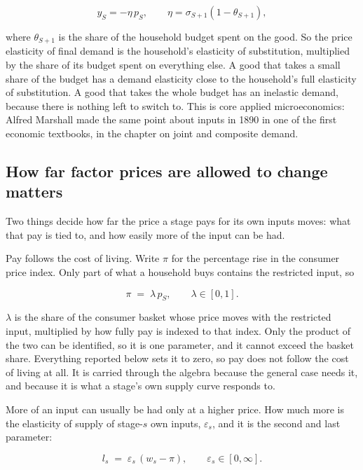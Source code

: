 \documentclass[11pt,a4paper]{article}
\begin{document}
\begin{equation}
y_S = -\eta \, p_S, \qquad \eta = \sigma_{S+1}(1-\theta_{S+1}) ,
\end{equation}

where $\theta_{S+1}$ is the share of the household budget spent on the good. So the price elasticity of final demand is the household's elasticity of substitution, multiplied by the share of its budget spent on everything else. A good that takes a small share of the budget has a demand elasticity close to the household's full elasticity of substitution. A good that takes the whole budget has an inelastic demand, because there is nothing left to switch to. This is core applied microeconomics: Alfred Marshall made the same point about inputs in 1890 in one of the first economic textbooks, in the chapter on joint and composite demand.

\subsection{How far factor prices are allowed to change matters}
\label{sec:factor}

Two things decide how far the price a stage pays for its own inputs moves: what that pay is tied to, and how easily more of the input can be had.

Pay follows the cost of living. Write $\pi$ for the percentage rise in the consumer price index. Only part of what a household buys contains the restricted input, so

\begin{equation}
\pi \;=\; \lambda \, p_S , \qquad \lambda \in [0,1] .
\end{equation}

$\lambda$ is the share of the consumer basket whose price moves with the restricted input, multiplied by how fully pay is indexed to that index. Only the product of the two can be identified, so it is one parameter, and it cannot exceed the basket share. Everything reported below sets it to zero, so pay does not follow the cost of living at all. It is carried through the algebra because the general case needs it, and because it is what a stage's own supply curve responds to.

More of an input can usually be had only at a higher price. How much more is the elasticity of supply of stage-$s$ own inputs, $\varepsilon_s$, and it is the second and last parameter:

\begin{equation}
l_s \;=\; \varepsilon_s \,(w_s - \pi) , \qquad \varepsilon_s \in [0, \infty] .
\end{equation}
\end{document}
